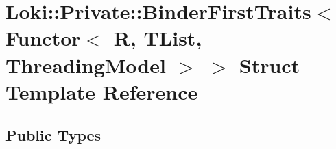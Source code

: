 \hypertarget{structLoki_1_1Private_1_1BinderFirstTraits_3_01Functor_3_01R_00_01TList_00_01ThreadingModel_01_4_01_4}{}\section{Loki\+:\+:Private\+:\+:Binder\+First\+Traits$<$ Functor$<$ R, T\+List, Threading\+Model $>$ $>$ Struct Template Reference}
\label{structLoki_1_1Private_1_1BinderFirstTraits_3_01Functor_3_01R_00_01TList_00_01ThreadingModel_01_4_01_4}
\subsection*{Public Types}
